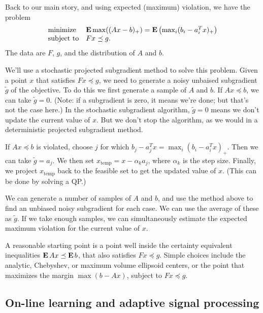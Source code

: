 \documentclass[12pt]{article}
\begin{document}
Back to our main story, and using expected (maximum) violation,
we have the problem
\[
\begin{array}{ll}
\mbox{minimize} & \mathop{\bf E{}} \max((Ax-b)_+) =
\mathop{\bf E{}} \left(\max_i (b_i-a_i^Tx)_+ \right)\\
\mbox{subject to} & Fx \preceq g.
\end{array}
\]
The data are $F$, $g$, and the distribution of $A$ and $b$.

We'll use a stochastic projected subgradient method to solve
this problem.
Given a point $x$ that satisfies $Fx \preceq g$, we need to
generate a noisy unbaised subgradient $\tilde g$ of the objective.
To do this we first
generate a sample of $A$ and $b$.
If $Ax \preceq b$, we can take $\tilde g=0$.
(Note: if a subgradient is zero, it means we're done; but that's not
the case here.)
In the stochastic subgradient algorithm,
$\tilde g=0$ means we don't update
the current value of $x$.  But we don't stop the algorithm,
as we would in a deterministic projected subgradient method.

If $Ax \preceq b$ is violated, choose $j$ for which
$b_j-a_j^Tx= \max_i (b_i-a_i^Tx)_+$.  Then we can take $\tilde g
= a_j$.  We then set $x_\mathrm{temp}=x-\alpha_k a_j$,
where $\alpha_k$ is the step size.
Finally, we project $x_\mathrm{temp}$ back to the feasible set
to get the updated value of $x$.  (This can be done by solving a QP.)

We can generate a number of samples of $A$ and $b$, and use the
method above to find an unbiased noisy subgradient for each case.
We can use the average of these as $\tilde g$.
If we take enough samples, we can simultaneously estimate
the expected maximum violation for the current value of $x$.

A reasonable starting point is a point well inside the certainty
equivalent inequalities $\mathop{\bf E{}} A x \preceq \mathop{\bf E{}} b$,
that also satisfies $F x \preceq g$.
Simple choices include the analytic, Chebyshev, or maximum
volume ellipsoid centers, or the point that maximizes the margin
$\max (b-Ax)$, subject to $Fx \preceq g$.

\subsection{On-line learning and adaptive signal processing}
\end{document}
